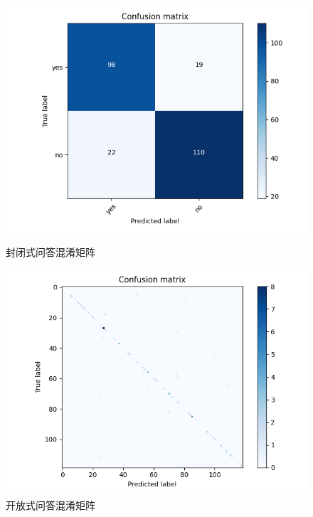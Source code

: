 \begin{figure}[htbp]
	\begin{minipage}{0.5\linewidth}
		\centering	
		\includegraphics[width=1.2\textwidth]{Fig/myfig/chapter3/close_confusionmatrix.png}  %
		\caption{\label{close_confusionmatrix}封闭式问答混淆矩阵} 	
	\end{minipage}
	\begin{minipage}{0.5\linewidth}
		\centering	
		\includegraphics[width=1.2\textwidth]{Fig/myfig/chapter3/open_confusionmatrix.png}  %
		\caption{\label{open_confusionmatrix}开放式问答混淆矩阵} 	
	\end{minipage}	
\end{figure}

